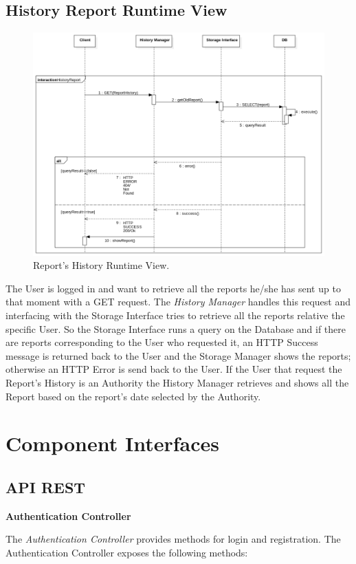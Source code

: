 \documentclass{report}
\begin{document}
\subsection{History Report Runtime View}
\begin{figure}[!ht]
	\begin{center}
	\includegraphics[width=\textwidth]{img/HistoryReport.png}
    \end{center}
    \label{fig:HistoryReportSD}
	\caption{Report's History Runtime View.}
\end{figure}
The User is logged in and want to retrieve all the reports he/she has sent up to that moment with a GET request. The \textit{History Manager} handles this request and interfacing with the Storage Interface tries to retrieve all the reports relative the specific User. So the Storage Interface runs a query on the Database and if there are reports corresponding to the User who requested it, an HTTP Success message is returned back to the User and the Storage Manager shows the reports; otherwise an HTTP Error is send back to the User.
If the User that request the Report's History is an Authority the History Manager retrieves and shows all the Report based on the report's date selected by the Authority.   

\section{Component Interfaces}
\subsection{API REST}
\begin{center}\large{\textbf{Authentication Controller}}\end{center}
The \textit{Authentication Controller} provides methods for login and registration.
The Authentication Controller exposes the following methods: \\
\end{document}
